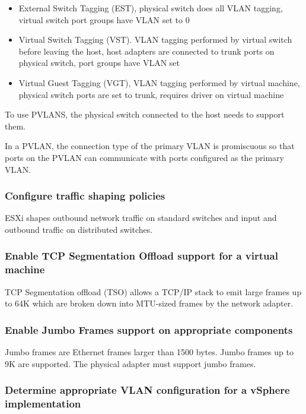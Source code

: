\begin{itemize}

\item External Switch Tagging (EST), physical switch does all VLAN tagging,
virtual switch port groups have VLAN set to 0

\item Virtual Switch Tagging (VST). VLAN tagging performed by virtual switch
before leaving the host, host adapters are connected to trunk ports on
physical switch, port groups have VLAN set

\item Virtual Guest Tagging (VGT), VLAN tagging performed by virtual machine,
physical switch ports are set to trunk, requires driver on virtual machine

\end{itemize}

To use PVLANS, the physical switch connected to the host needs to support them.

In a PVLAN, the connection type of the primary VLAN is promiscuous so that
ports on the PVLAN can communicate with ports configured as the primary VLAN.

\subsubsection{Configure traffic shaping policies}

ESXi shapes outbound network traffic on standard switches and input and
outbound traffic on distributed switches.

\subsubsection{Enable TCP Segmentation Offload support for a virtual machine}

TCP Segmentation offload (TSO) allows a TCP/IP stack to emit large frames
up to 64K which are broken down into MTU-sized frames by the network adapter.

\subsubsection{Enable Jumbo Frames support on appropriate components}

Jumbo frames are Ethernet frames larger than 1500 bytes. Jumbo frames up to 9K
are supported. The physical adapter must support jumbo frames.

\subsubsection{Determine appropriate VLAN configuration for a vSphere implementation}
